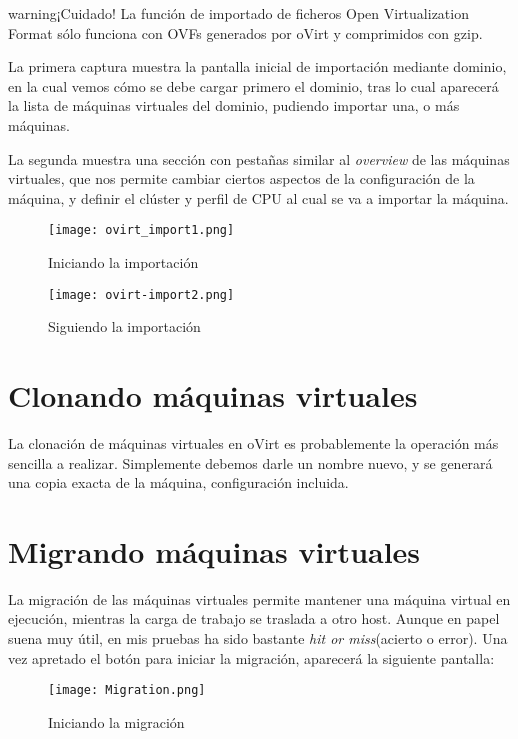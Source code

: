 \begin{TMbulletin}{warning}{$¡$Cuidado!}
  La función de importado de ficheros Open Virtualization Format sólo funciona con OVFs generados por oVirt y comprimidos con gzip.
\end{TMbulletin}

La primera captura muestra la pantalla inicial de importación mediante dominio, en la cual vemos cómo se debe cargar primero el dominio, tras lo cual aparecerá la lista de máquinas virtuales del dominio, pudiendo importar una, o más máquinas.

La segunda muestra una sección con pestañas similar al \emph{overview} de las máquinas virtuales, que nos permite cambiar ciertos aspectos de la configuración de la máquina, y definir el clúster y perfil de CPU al cual se va a importar la máquina.

\begin{figure}[ht!]
  \centering
  \texttt{[image: ovirt\_import1.png]}
  \caption{\label{fig:import_start} Iniciando la importación}
\end{figure}

\begin{figure}[ht!]
  \centering
  \texttt{[image: ovirt-import2.png]}
  \caption{\label{fig:import_start} Siguiendo la importación}
\end{figure}
\clearpage

\section{Clonando máquinas virtuales}
\label{sec:consola}

La clonación de máquinas virtuales en oVirt es probablemente la operación más sencilla a realizar. Simplemente debemos darle un nombre nuevo, y se generará una copia exacta de la máquina, configuración incluida.

\section{Migrando máquinas virtuales}
\label{sec:migración}

La migración de las máquinas virtuales permite mantener una máquina virtual en ejecución, mientras la carga de trabajo se traslada a otro host. Aunque en papel suena muy útil, en mis pruebas ha sido bastante \emph{hit or miss}(acierto o error). Una vez apretado el botón para iniciar la migración, aparecerá la siguiente pantalla:

\begin{figure}[ht!]
  \centering
  \texttt{[image: Migration.png]}
  \caption{\label{fig:migration_start} Iniciando la migración}
\end{figure}

